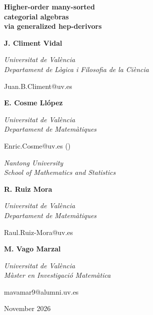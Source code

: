 \documentclass[a4paper, reqno]{amsbook}
\theoremstyle{plain}
\theoremstyle{definition}
\begin{document}

\frontmatter

\thispagestyle{empty}
\begin{center}
\vspace*{2.5cm}
{\Huge\bfseries Higher-order many-sorted\\[10pt] categorial algebras\\[10pt] via generalized hep-derivors\par}

\vspace{3cm}

{\bfseries J. Climent Vidal\par}
\vspace{4pt}
{\small\itshape Universitat de Val\`{e}ncia\\
Departament de L\`{o}gica i Filosofia de la Ci\`{e}ncia\par}
{\small Juan.B.Climent@uv.es\par}

\vspace{0.6cm}

{\bfseries E. Cosme Ll\'{o}pez\par}
\vspace{4pt}
{\small\itshape Universitat de Val\`{e}ncia\\
Departament de Matem\`{a}tiques\par}
{\small Enric.Cosme@uv.es (\faEnvelope[regular])\par}
\vspace{3pt}
{\small\itshape Nantong University\\
School of Mathematics and Statistics\par}

\vspace{0.6cm}

{\bfseries R. Ruiz Mora\par}
\vspace{4pt}
{\small\itshape Universitat de Val\`{e}ncia\\
Departament de Matem\`{a}tiques\par}
{\small Raul.Ruiz-Mora@uv.es\par}

\vspace{0.6cm}

{\bfseries M. Vago Marzal\par}
\vspace{4pt}
{\small\itshape Universitat de Val\`{e}ncia\\
M\`{a}ster en Investigaci\'{o} Matem\`{a}tica\par}
{\small mavamar9@alumni.uv.es\par}

\vfill
{\small November 2026\par}
\end{center}
\cleardoublepage
\end{document}
